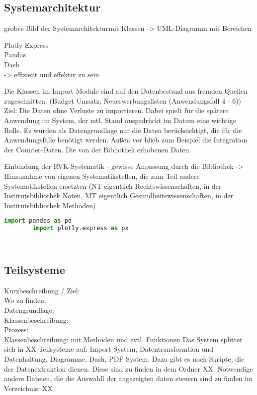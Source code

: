     \subsection{Systemarchitektur}
    
    grobes Bild der Systemarchitekturmit Klassen -> UML-Diagramm mit Bereichen
    
    
    Plotly Express\\
    Pandas\\
    Dash\\
    -> effizient und effektiv zu sein


Die Klassen im Import Module sind auf den Datenbestand aus fremden Quellen zugeschnitten.
(Budget Umsatz, Neuerwerbungslisten (Anwendungsfall 4 - 6))
Ziel: Die Daten ohne Verluste zu importieren. Dabei spielt für die spätere Anwendung im System, der mtl. Stand
ausgedrückt im Datum eine wichtige Rolle.
Es wurden als Datengrundlage nur die Daten berücksichtigt, die für die Anwendungsfälle benötigt werden.
Außen vor blieb zum Beispiel die Integration der Counter-Daten.
Die von der Bibliothek erhobenen Daten

Einbindung der RVK-Systematik - gewisse Anpassung durch die Bibliothek -> Hinzunahme von eigenen Systematikstellen,
die zum Teil andere Systematikstellen ersetzten (NT eigentlich Rechtswissenschaften, in der Institutsbibliothek Noten, MT eigentlich
Gesundheitswissenschaften, in der Institutsbibliothek Methoden)

    \begin{lstlisting}[language=Python, caption=Python example]
        import pandas as pd
        import plotly.express as px

        
    \end{lstlisting}

    \subsection{Teilsysteme}
    
    Kurzbeschreibung / Ziel:\\
    Wo zu finden:\\
    Datengrundlage:\\
    Klassenbeschreibung:\\
    Prozess:\\
    
    Klassenbeschreibung: mit Methoden und evtl. Funktionen
    Das System splittet sich in XX Teilsysteme auf: Import-System, Datentransformtion und Datenhaltung, Diagramme, Dash, PDF-System. Dazu gibt es noch Skripte,
    die der Datenextraktion dienen. Diese sind zu finden in dem Ordner XX. Notwendige andere Dateien, die die Auswahll der angezeigten daten steuern sind zu finden im Verzeichnis: XX
    
